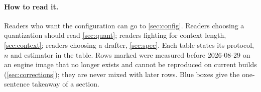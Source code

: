 \paragraph{How to read it.} Readers who want the configuration can go to \cref{sec:config}. Readers
choosing a quantization should read \cref{sec:quant}; readers fighting for context length,
\cref{sec:context}; readers choosing a drafter, \cref{sec:spec}. Each table states its protocol,
$n$ and estimator in the table. Rows marked \hist{} were measured before 2026-08-29 on an engine image
that no longer exists and cannot be reproduced on current builds (\cref{sec:corrections}); they are
never mixed with later rows. Blue boxes give the one-sentence takeaway of a section.
